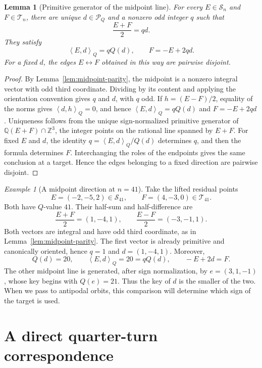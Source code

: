 \documentclass[11pt]{amsart}
\newtheorem{lemma}[theorem]{Lemma}
\theoremstyle{definition}
\theoremstyle{remark}
\newtheorem{example}[theorem]{Example}
\newcommand{\Sn}{\mathcal S_n}
\newcommand{\Tn}{\mathcal T_n}
\newcommand{\Dcal}{\mathcal P_Q}
\newcommand{\Qip}[2]{\left\langle #1,#2\right\rangle_Q}
\begin{document}
\begin{lemma}[Primitive generator of the midpoint line]
\label{lem:midpoint-direction}
For every $E\in\Sn$ and $F\in\Tn$, there are unique $d\in\Dcal$ and a
nonzero odd integer $q$ such that
\[
 \frac{E+F}{2}=qd.
\]
They satisfy
\[
 \Qip{E}{d}=qQ(d),
 \qquad
 F=-E+2qd.
\]
For a fixed $d$, the edges $E\leftrightarrow F$ obtained in this way are
pairwise disjoint.
\end{lemma}

\begin{proof}
By Lemma~\ref{lem:midpoint-parity}, the midpoint is a nonzero integral vector
with odd third coordinate.  Dividing by its content and applying the
orientation convention gives $q$ and $d$, with $q$ odd.  If
$h=(E-F)/2$, equality of the norms gives $\Qip{d}{h}=0$, and hence
$\Qip{E}{d}=qQ(d)$ and $F=-E+2qd$.  Uniqueness follows from the unique
sign-normalized primitive generator of
$\mathbb Q(E+F)\cap\mathbb Z^3$, the integer points on the rational line
spanned by $E+F$.  For fixed $E$ and $d$, the identity
$q=\Qip{E}{d}/Q(d)$ determines $q$, and then the formula determines $F$.
Interchanging the roles of the endpoints gives the same conclusion at a
target.  Hence the edges belonging to a fixed direction are pairwise
disjoint.
\end{proof}

\begin{example}[A midpoint direction at $n=41$]
\label{ex:midpoint-41}
Take the lifted residual points
\[
 E=(-2,-5,2)\in\mathcal S_{41},
 \qquad
 F=(4,-3,0)\in\mathcal T_{41}.
\]
Both have $Q$-value $41$.  Their half-sum and half-difference are
\[
 \frac{E+F}{2}=(1,-4,1),
 \qquad
 \frac{E-F}{2}=(-3,-1,1).
\]
Both vectors are integral and have odd third coordinate, as in
Lemma~\ref{lem:midpoint-parity}.  The first vector is already
primitive and canonically oriented, hence $q=1$ and
$d=(1,-4,1)$.  Moreover,
\[
 Q(d)=20,
 \qquad
 \Qip{E}{d}=20=qQ(d),
 \qquad
 -E+2d=F.
\]
The other midpoint line is generated, after sign normalization, by
$e=(3,1,-1)$, whose key begins with $Q(e)=21$.  Thus the key of $d$ is the
smaller of the two.  When we pass to antipodal orbits, this comparison will
determine which sign of the target is used.
\end{example}

\section{A direct quarter-turn correspondence}\label{sec:quarter-turn}
\end{document}
